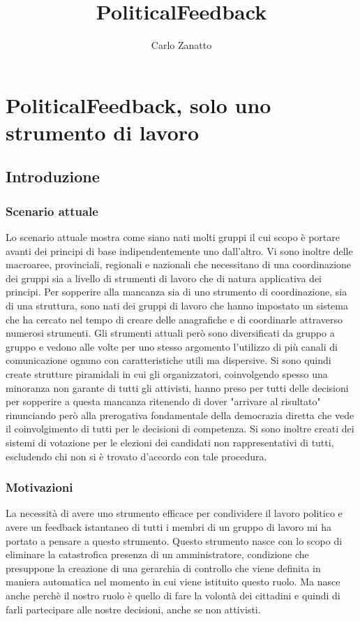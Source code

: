 \documentclass[10pt,a4paper]{book}
\author{Carlo Zanatto}
\title{PoliticalFeedback}
\begin{document}
\part{PoliticalFeedback, solo uno strumento di lavoro}

\chapter{Introduzione}

\section{Scenario attuale}

Lo scenario attuale mostra come siano nati molti gruppi il cui scopo è portare avanti dei principi di base indipendentemente uno dall'altro. Vi sono inoltre delle macroaree, provinciali, regionali e nazionali che necessitano di una coordinazione dei gruppi sia a livello di strumenti di lavoro che di natura applicativa dei principi.
Per sopperire alla mancanza sia di uno strumento di coordinazione, sia di una struttura, sono nati dei gruppi di lavoro che hanno impostato un sistema che ha cercato nel tempo di creare delle anagrafiche e di coordinarle attraverso numerosi strumenti.
Gli strumenti attuali però sono diversificati da gruppo a gruppo e vedono alle volte per uno stesso argomento l'utilizzo di più canali di comunicazione ognuno con caratteristiche utili ma dispersive.
Si sono quindi create strutture piramidali in cui gli organizzatori, coinvolgendo spesso una minoranza non garante di tutti gli attivisti, hanno preso per tutti delle decisioni per sopperire a questa mancanza ritenendo di dover "arrivare al risultato" rinunciando però alla prerogativa fondamentale della democrazia diretta che vede il coinvolgimento di tutti per le decisioni di competenza.
Si sono inoltre creati dei sistemi di votazione per le elezioni dei candidati non rappresentativi di tutti, escludendo chi non si è trovato d'accordo con tale procedura.



\section{Motivazioni}
La necessità di avere uno strumento efficace per condividere il lavoro politico e avere un feedback istantaneo di tutti i membri di un gruppo di lavoro mi ha portato a pensare a questo strumento. Questo strumento nasce con lo scopo di eliminare la catastrofica presenza di un amministratore, condizione che presuppone la creazione di una gerarchia di controllo che viene definita in maniera automatica nel momento in cui viene istituito questo ruolo. Ma nasce anche perchè il nostro ruolo è quello di fare la volontà dei cittadini e quindi di farli partecipare alle nostre decisioni, anche se non attivisti.
\end{document}
